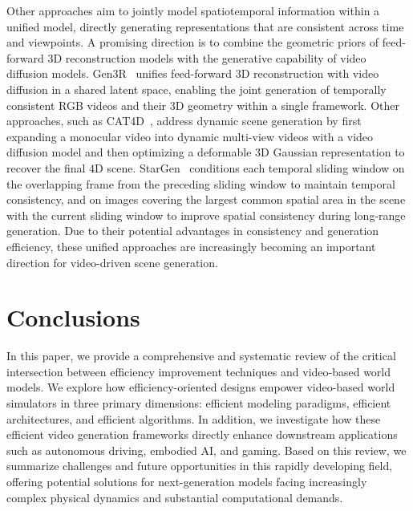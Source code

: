 \documentclass[lettersize,journal]{IEEEtran}
\begin{document}
Other approaches aim to jointly model spatiotemporal information within a unified model, directly generating representations that are consistent across time and viewpoints. A promising direction is to combine the geometric priors of feed-forward 3D reconstruction models with the generative capability of video diffusion models. Gen3R~\cite{huang2026gen3r3dscenegeneration} unifies feed-forward 3D reconstruction with video diffusion in a shared latent space, enabling the joint generation of temporally consistent RGB videos and their 3D geometry within a single framework. Other approaches, such as CAT4D~\cite{wu2024cat4dcreate4dmultiview}, address dynamic scene generation by first expanding a monocular video into dynamic multi-view videos with a video diffusion model and then optimizing a deformable 3D Gaussian representation to recover the final 4D scene. StarGen~\cite{zhai2025stargenspatiotemporalautoregressionframework} conditions each temporal sliding window on the overlapping frame from the preceding sliding window to maintain temporal consistency, and on images covering the largest common spatial area in the scene with the current sliding window to improve spatial consistency during long-range generation. Due to their potential advantages in consistency and generation efficiency, these unified approaches are increasingly becoming an important direction for video-driven scene generation.

\section{Conclusions}
\label{sec:conclusions}
In this paper, we provide a comprehensive and systematic review of the critical intersection between efficiency improvement techniques and video-based world models. We explore how efficiency-oriented designs empower video-based world simulators in three primary dimensions: efficient modeling paradigms, efficient architectures, and efficient algorithms. In addition, we investigate how these efficient video generation frameworks directly enhance downstream applications such as autonomous driving, embodied AI, and gaming. Based on this review, we summarize challenges and future opportunities in this rapidly developing field, offering potential solutions for next-generation models facing increasingly complex physical dynamics and substantial computational demands. 
\end{document}
